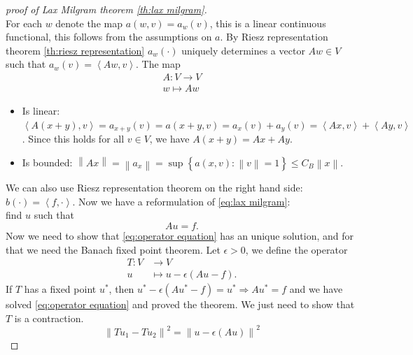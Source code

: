 \documentclass[../Main/main.tex]{subfiles}
\begin{document}
	\begin{proof}[proof of Lax Milgram theorem \ref{th:lax milgram}]
		$ $\\
		For each $w$ denote the map $a(w,v) = a_w(v)$, this is a linear continuous functional, this follows from the assumptions on $a$. By Riesz representation theorem \ref{th:riesz representation} $a_w(\cdot)$ uniquely determines a vector $Aw \in V$ such that $a_w(v) = \left \langle Aw,v \right \rangle$. The map
		\begin{equation*}
			\begin{gathered}
				A:V\rightarrow V \\
				w \mapsto Aw
			\end{gathered}
		\end{equation*}
		\begin{itemize}
			\item 		Is linear: $\left \langle A(x+y),v  \right \rangle = a_{x+y}(v) = a(x+y,v) = a_x(v)+a_y(v) = \left \langle Ax,v \right \rangle+\left \langle Ay,v \right \rangle$. Since this holds for all $v \in V$, we have $A(x+y)=Ax + Ay$.
			\item Is bounded: $\left \| Ax \right \|=\left \| a_x \right \| = \sup \left \{ a(x,v):\left \| v \right \|=1 \right \} \leq C_B \left \| x \right \|$.
		\end{itemize}
		We can also use Riesz representation theorem on the right hand side: $b(\cdot)=\left \langle f,\cdot \right \rangle$. Now we have a reformulation of \eqref{eq:lax milgram}:\\
		find $u$ such that
		\begin{equation}\label{eq:operator equation}
			Au = f.
		\end{equation}
		Now we need to show that \eqref{eq:operator equation} has an unique solution, and for that we need the Banach fixed point theorem. Let $\epsilon > 0$, we define the operator 
		\begin{equation*}
			\begin{aligned}
				T:V &\rightarrow V \\
				u &\mapsto u-\epsilon (Au-f).
			\end{aligned}
		\end{equation*}
		If $T$ has a fixed point $u^*$, then $u^*-\epsilon(Au^*-f)=u^* \Rightarrow Au^* =f$ and we have solved \eqref{eq:operator equation} and proved the theorem. We just need to show that $T$ is a contraction.
		\begin{equation*}
			\left \| Tu_1 - Tu_2 \right \|^2 = \left \| u-\epsilon(Au) \right \|^2 

\end{equation*}
\end{proof}
\end{document}
